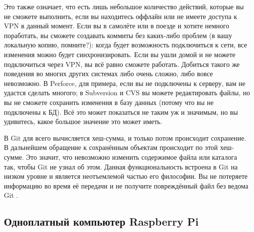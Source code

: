 Это также означает, что есть лишь небольшое количество действий, которые вы не сможете выполнить, если вы находитесь оффлайн или не имеете доступа к VPN в данный момент. Если вы в самолёте или в поезде и хотите немного поработать, вы сможете создавать коммиты без каких-либо проблем (в вашу локальную копию, помните?): когда будет возможность подключиться к сети, все изменения можно будет синхронизировать. Если вы ушли домой и не можете подключиться через VPN, вы всё равно сможете работать.
Добиться такого же поведения во многих других системах либо очень сложно, либо вовсе
невозможно. В Perforce, для примера, если вы не подключены к серверу, вам не удастся
сделать многого; в Subversion и CVS вы можете редактировать файлы, но вы не сможете
сохранить изменения в базу данных (потому что вы не подключены к БД). Всё это может
показаться не таким уж и значимым, но вы удивитесь, какое большое значение это может
иметь.

В Git для всего вычисляется хеш-сумма, и только потом происходит сохранение. В
дальнейшем обращение к сохранённым объектам происходит по этой хеш-сумме. Это
значит, что невозможно изменить содержимое файла или каталога так, чтобы Git не узнал
об этом. Данная функциональность встроена в Git на низком уровне и является
неотъемлемой частью его философии. Вы не потеряете информацию во время её передачи и
не получите повреждённый файл без ведома Git \cite{ProGit}.

\subsection{Одноплатный компьютер Raspberry Pi}

\newpage

